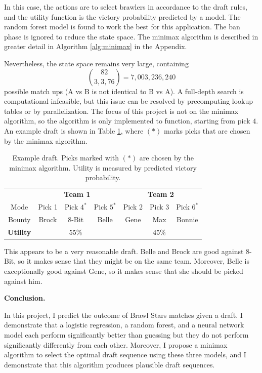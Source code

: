 \documentclass[12pt]{article}
\begin{document}
In this case, the actions are to select brawlers in accordance to the draft rules, and the utility function is the victory probability predicted by a model. The random forest model is found to work the best for this application. The ban phase is ignored to reduce the state space. The minimax algorithm is described in greater detail in Algorithm \ref{alg:minimax} in the Appendix.

Nevertheless, the state space remains very large, containing 
$$\binom{82}{3,3,76} = 7,003,236,240$$
possible match ups (A vs B is not identical to B vs A). A full-depth search is computational infeasible, but this issue can be resolved by precomputing lookup tables or by parallelization. The focus of this project is not on the minimax algorithm, so the algorithm is only implemented to function, starting from pick $4$. An example draft is shown in Table \ref{tab:draft}, where $(*)$ marks picks that are chosen by the minimax algorithm.

\begin{table}[h!]
\centering
\begin{tabular}{c|ccc|ccc}
    & \multicolumn{3}{c|}{\textbf{Team 1}} & \multicolumn{3}{c}{\textbf{Team 2}} \\ 
    Mode & Pick 1 & Pick $4^{*}$ & Pick $5^{*}$ & Pick 2 & Pick 3 & Pick $6^{*}$ \\
    Bounty & Brock & 8-Bit & Belle & Gene & Max & Bonnie \\
    \hline
    \textbf{Utility} & & 55\% & &  & 45\% & 
\end{tabular}
\caption{Example draft. Picks marked with $(*)$ are chosen by the minimax algorithm. Utility is measured by predicted victory probability.}
\label{tab:draft}
\end{table}

This appears to be a very reasonable draft. Belle and Brock are good against 8-Bit, so it makes sense that they might be on the same team. Moreover, Belle is exceptionally good against Gene, so it makes sense that she should be picked against him.

\textbf{Conclusion.}

In this project, I predict the outcome of Brawl Stars matches given a draft. I demonstrate that a logistic regression, a random forest, and a neural network model each perform significantly better than guessing but they do not perform significantly differently from each other. Moreover, I propose a minimax algorithm to select the optimal draft sequence using these three models, and I demonstrate that this algorithm produces plausible draft sequences.
\end{document}
